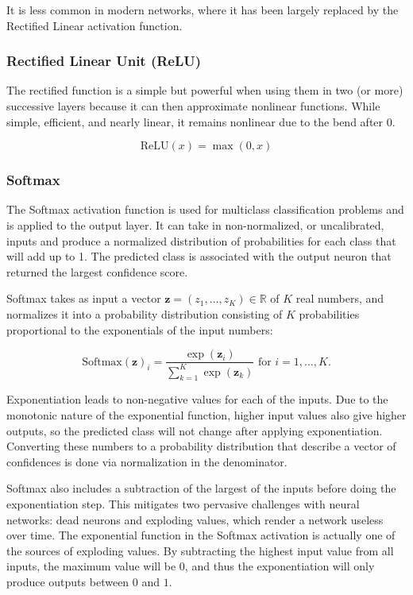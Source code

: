 \documentclass[a4paper]{article}
\newcommand{\vect}[1]{\bm{#1}}
\begin{document}
It is less common in modern networks, where it has been largely replaced by the Rectified Linear activation function.

\subsubsection*{Rectified Linear Unit (ReLU)}

The rectified function is a simple but powerful when using them in two (or more) successive layers because it can then approximate nonlinear functions. While simple, efficient, and nearly linear, it remains nonlinear due to the bend after 0.

\begin{equation*}
    \text{ReLU}(x) = \max(0, x)
\end{equation*}

\subsubsection*{Softmax}
The Softmax activation function is used for multiclass classification problems and is applied to the output layer. It can take in non-normalized, or uncalibrated, inputs and produce a normalized distribution of probabilities for each class that will add up to 1. The predicted class is associated with the output neuron that returned the largest confidence score.

Softmax takes as input a vector $\vect{z} = (z_1, \ldots, z_K) \in \mathbb{R}$ of $K$ real numbers, and normalizes it into a probability distribution consisting of $K$ probabilities proportional to the exponentials of the input numbers:

\begin{equation*}
    \text{Softmax}(\vect{z})_i = \frac{\exp(\vect{z}_i)}{\sum_{k=1}^K \exp(\vect{z}_k)} \text{ for } i = 1, \ldots, K.
\end{equation*}

Exponentiation leads to non-negative values for each of the inputs. Due to the monotonic nature of the exponential function, higher input values also give higher outputs, so the predicted class will not change after applying exponentiation. Converting these numbers to a probability distribution that describe a vector of confidences is done via normalization in the denominator.

Softmax also includes a subtraction of the largest of the inputs before doing the exponentiation step. This mitigates two pervasive challenges with neural networks: dead neurons and exploding values, which render a network useless over time. The exponential function in the Softmax activation is actually one of the sources of exploding values. By subtracting the highest input 
value from all inputs, the maximum value will be $0$, and thus the exponentiation will only produce 
outputs between $0$ and $1$.
\end{document}
